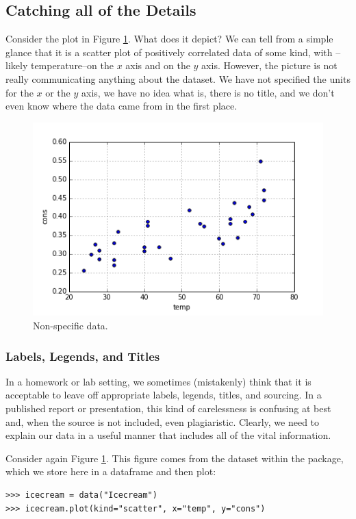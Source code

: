 \subsection*{Catching all of the Details}

Consider the plot in Figure \ref{fig:nolabels}. 
What does it depict?
We can tell from a simple glance that it is a scatter plot of positively correlated data of some kind, with --likely temperature--on the $x$ axis and  on the $y$ axis. 
However, the picture is not really communicating anything about the dataset. We have not specified the units for the $x$ or the $y$ axis, we have no idea what  is, there is no title, and we don't even know where the data came from in the first place. 

\begin{figure}[H] 
    \centering
    \includegraphics[width=.75\textwidth]{Nolabels.png}
    \caption{Non-specific data.}
    \label{fig:nolabels}
\end{figure}

\subsubsection*{Labels, Legends, and Titles}
In a homework or lab setting, we sometimes (mistakenly) think that it is acceptable to leave off appropriate labels, legends, titles, and sourcing.
In a published report or presentation, this kind of carelessness is confusing at best and, when the source is not included, even plagiaristic.
Clearly, we need to explain our data in a useful manner that includes all of the vital information.

Consider again Figure \ref{fig:nolabels}. 
This figure comes from the  dataset within the  package, which we store here in a dataframe and then plot:
\begin{lstlisting}
>>> icecream = data("Icecream")
>>> icecream.plot(kind="scatter", x="temp", y="cons")
\end{lstlisting}


